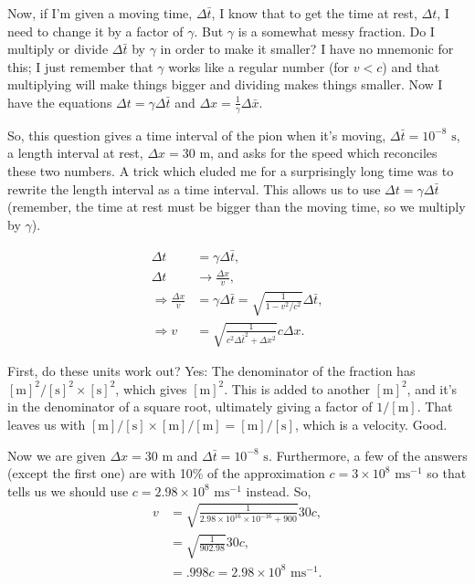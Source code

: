 \documentclass[11pt]{paper}
\begin{document}
Now, if I'm given a moving time, $\Delta \bar{t}$, I know that to get the time at rest, $\Delta {t}$, I need to change it by a factor of $\gamma$.  But $\gamma$ is a somewhat messy fraction.  Do I multiply or divide $\Delta \bar{t}$ by $\gamma$ in order to make it smaller?  I have no mnemonic for this; I just remember that $\gamma$ works like a regular number (for $v<c$) and that multiplying will make things bigger and dividing makes things smaller.  Now I have the equations $\Delta t = \gamma \Delta \bar{t}$ and $\Delta x = \frac{1}{\gamma} \Delta \bar{x}$.

So, this question gives a time interval of the pion when it's moving, $\Delta \bar{t} = 10^{-8} \text{ s}$, a length interval at rest, $\Delta x = 30\text{ m}$, and asks for the speed which reconciles these two numbers.  A trick which eluded me for a surprisingly long time was to rewrite the length interval as a time interval.  This allows us to use $\Delta t = \gamma \Delta \bar{t}$ (remember, the time at rest must be bigger than the moving time, so we multiply by $\gamma$).

\begin{align}
\Delta t &= \gamma \Delta \bar{t},\\
\Delta t &\rightarrow \frac{\Delta x}{v},\\
\Rightarrow \frac{\Delta x}{v} &= \gamma\Delta \bar{t} = \sqrt{\frac{1}{1-v^2/c^2}}\Delta \bar{t},\\
\Rightarrow v &= \sqrt{\frac{1}{c^2\Delta \bar{t}^2+\Delta x^2}}c\Delta x.
\end{align}

First, do these units work out?  Yes:  The denominator of the fraction has $[\text{m}]^2/[\text{s}]^2 \times [\text{s}]^2$, which gives $[\text{m}]^2$.  This is added to another $[\text{m}]^2$, and it's in the denominator of a square root, ultimately giving a factor of $1/[\text{m}]$.  That leaves us with $[\text{m}]/[\text{s}] \times [\text{m}]/[\text{m}] = [\text{m}]/[\text{s}]$, which is a velocity.  Good.

Now we are given $\Delta x = 30 \text{ m}$ and $\Delta \bar{t} = 10^{-8}\text{ s}$.  Furthermore, a few of the answers (except the first one) are with 10\% of the approximation $c = 3\times10^8 \text{ ms}^{-1}$ so that tells us we should use $c = 2.98\times 10^{8}\text { ms}^{-1}$ instead.  So,
\begin{align}
v &= \sqrt{\frac{1}{2.98\times10^{16} \times 10^{-16}+900}} 30c,\\
&= \sqrt{\frac{1}{902.98}} 30c,\\
&= .998 c = 2.98\times10^8 \text{ ms}^{-1}.
\end{align}
\end{document}
